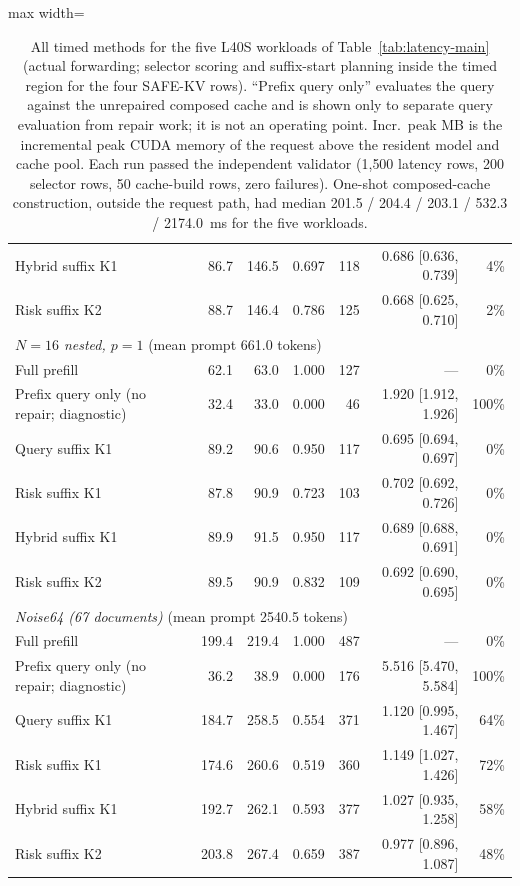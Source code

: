 \begin{table}[t]
\begin{adjustbox}{max width=\textwidth}
\begin{tabular}{lrrrrrr}
Hybrid suffix K1 & 86.7 & 146.5 & 0.697 & 118 & 0.686 [0.636, 0.739] & 4\% \\
Risk suffix K2 & 88.7 & 146.4 & 0.786 & 125 & 0.668 [0.625, 0.710] & 2\% \\
\midrule
\multicolumn{7}{l}{\emph{$N{=}16$ nested, $p{=}1$} (mean prompt 661.0 tokens)} \\
Full prefill & 62.1 & 63.0 & 1.000 & 127 & --- & 0\% \\
Prefix query only (no repair; diagnostic) & 32.4 & 33.0 & 0.000 & 46 & 1.920 [1.912, 1.926] & 100\% \\
Query suffix K1 & 89.2 & 90.6 & 0.950 & 117 & 0.695 [0.694, 0.697] & 0\% \\
Risk suffix K1 & 87.8 & 90.9 & 0.723 & 103 & 0.702 [0.692, 0.726] & 0\% \\
Hybrid suffix K1 & 89.9 & 91.5 & 0.950 & 117 & 0.689 [0.688, 0.691] & 0\% \\
Risk suffix K2 & 89.5 & 90.9 & 0.832 & 109 & 0.692 [0.690, 0.695] & 0\% \\
\midrule
\multicolumn{7}{l}{\emph{Noise64 (67 documents)} (mean prompt 2540.5 tokens)} \\
Full prefill & 199.4 & 219.4 & 1.000 & 487 & --- & 0\% \\
Prefix query only (no repair; diagnostic) & 36.2 & 38.9 & 0.000 & 176 & 5.516 [5.470, 5.584] & 100\% \\
Query suffix K1 & 184.7 & 258.5 & 0.554 & 371 & 1.120 [0.995, 1.467] & 64\% \\
Risk suffix K1 & 174.6 & 260.6 & 0.519 & 360 & 1.149 [1.027, 1.426] & 72\% \\
Hybrid suffix K1 & 192.7 & 262.1 & 0.593 & 377 & 1.027 [0.935, 1.258] & 58\% \\
Risk suffix K2 & 203.8 & 267.4 & 0.659 & 387 & 0.977 [0.896, 1.087] & 48\% \\
\bottomrule
\end{tabular}
\end{adjustbox}
\caption{All timed methods for the five L40S workloads of Table~\ref{tab:latency-main} (actual forwarding; selector scoring and suffix-start planning inside the timed region for the four SAFE-KV rows). ``Prefix query only'' evaluates the query against the unrepaired composed cache and is shown only to separate query evaluation from repair work; it is not an operating point. Incr.\ peak MB is the incremental peak CUDA memory of the request above the resident model and cache pool. Each run passed the independent validator (1{,}500 latency rows, 200 selector rows, 50 cache-build rows, zero failures). One-shot composed-cache construction, outside the request path, had median 201.5 / 204.4 / 203.1 / 532.3 / 2174.0~ms for the five workloads.}
\label{tab:app-lat-full}
\end{table}
